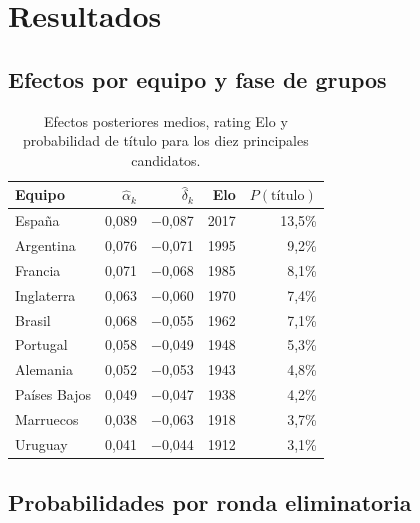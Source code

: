 \documentclass[12pt,a4paper]{article}
\begin{document}
\section{Resultados}
\label{sec:results}

\subsection{Efectos por equipo y fase de grupos}

\begin{table}[H]
\centering
\caption{Efectos posteriores medios, rating Elo y probabilidad de título para los diez principales candidatos.}
\label{tab:teams}
\begin{tabular}{lrrrr}
\toprule
\textbf{Equipo} & $\hat{\alpha}_k$ & $\hat{\delta}_k$ & \textbf{Elo} & $P(\text{título})$ \\
\midrule
España       &  0{,}089 & $-$0{,}087 & 2017 & 13{,}5\% \\
Argentina    &  0{,}076 & $-$0{,}071 & 1995 &  9{,}2\% \\
Francia      &  0{,}071 & $-$0{,}068 & 1985 &  8{,}1\% \\
Inglaterra   &  0{,}063 & $-$0{,}060 & 1970 &  7{,}4\% \\
Brasil       &  0{,}068 & $-$0{,}055 & 1962 &  7{,}1\% \\
Portugal     &  0{,}058 & $-$0{,}049 & 1948 &  5{,}3\% \\
Alemania     &  0{,}052 & $-$0{,}053 & 1943 &  4{,}8\% \\
Países Bajos &  0{,}049 & $-$0{,}047 & 1938 &  4{,}2\% \\
Marruecos    &  0{,}038 & $-$0{,}063 & 1918 &  3{,}7\% \\
Uruguay      &  0{,}041 & $-$0{,}044 & 1912 &  3{,}1\% \\
\bottomrule
\end{tabular}
\end{table}

\subsection{Probabilidades por ronda eliminatoria}
\end{document}
